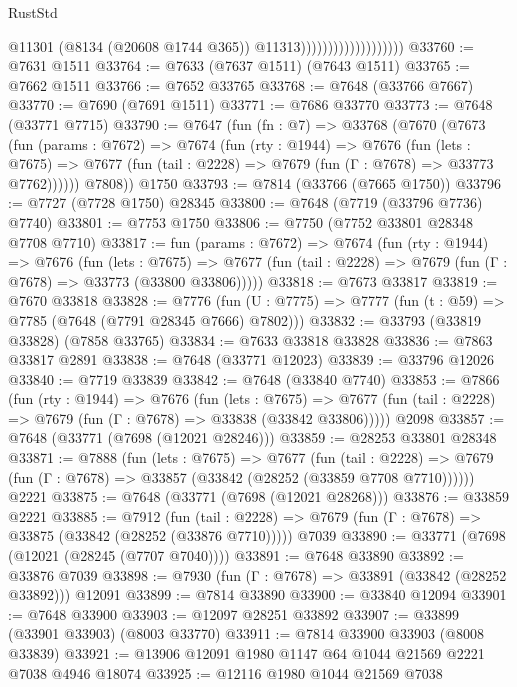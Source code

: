 \begin{lexlean}{RustStd}
\begin{coremodule}
                                          @11301
                                          (@8134 (@20608 @1744 @365))
                                          @11313)))))))))))))))))))
@33760 := @7631 @1511
@33764 := @7633 (@7637 @1511) (@7643 @1511)
@33765 := @7662 @1511
@33766 := @7652 @33765
@33768 := @7648 (@33766 @7667)
@33770 := @7690 (@7691 @1511)
@33771 := @7686 @33770
@33773 := @7648 (@33771 @7715)
@33790 := @7647
    (fun (fn : @7) =>
    @33768
      (@7670
        (@7673
          (fun (params : @7672) =>
          @7674
            (fun (rty : @1944) =>
            @7676
              (fun (lets : @7675) =>
              @7677 (fun (tail : @2228) => @7679 (fun (Γ : @7678) => @33773 @7762))))))
        @7808))
    @1750
@33793 := @7814 (@33766 (@7665 @1750))
@33796 := @7727 (@7728 @1750) @28345
@33800 := @7648 (@7719 (@33796 @7736) @7740)
@33801 := @7753 @1750
@33806 := @7750 (@7752 @33801 @28348 @7708 @7710)
@33817 := fun (params : @7672) =>
  @7674
    (fun (rty : @1944) =>
    @7676
      (fun (lets : @7675) =>
      @7677 (fun (tail : @2228) => @7679 (fun (Γ : @7678) => @33773 (@33800 @33806)))))
@33818 := @7673 @33817
@33819 := @7670 @33818
@33828 := @7776
    (fun (U : @7775) => @7777 (fun (t : @59) => @7785 (@7648 (@7791 @28345 @7666) @7802)))
@33832 := @33793 (@33819 @33828) (@7858 @33765)
@33834 := @7633 @33818 @33828
@33836 := @7863 @33817 @2891
@33838 := @7648 (@33771 @12023)
@33839 := @33796 @12026
@33840 := @7719 @33839
@33842 := @7648 (@33840 @7740)
@33853 := @7866
    (fun (rty : @1944) =>
    @7676
      (fun (lets : @7675) =>
      @7677 (fun (tail : @2228) => @7679 (fun (Γ : @7678) => @33838 (@33842 @33806)))))
    @2098
@33857 := @7648 (@33771 (@7698 (@12021 @28246)))
@33859 := @28253 @33801 @28348
@33871 := @7888
    (fun (lets : @7675) =>
    @7677
      (fun (tail : @2228) =>
      @7679 (fun (Γ : @7678) => @33857 (@33842 (@28252 (@33859 @7708 @7710))))))
    @2221
@33875 := @7648 (@33771 (@7698 (@12021 @28268)))
@33876 := @33859 @2221
@33885 := @7912
    (fun (tail : @2228) => @7679 (fun (Γ : @7678) => @33875 (@33842 (@28252 (@33876 @7710)))))
    @7039
@33890 := @33771 (@7698 (@12021 (@28245 (@7707 @7040))))
@33891 := @7648 @33890
@33892 := @33876 @7039
@33898 := @7930 (fun (Γ : @7678) => @33891 (@33842 (@28252 @33892))) @12091
@33899 := @7814 @33890
@33900 := @33840 @12094
@33901 := @7648 @33900
@33903 := @12097 @28251 @33892
@33907 := @33899 (@33901 @33903) (@8003 @33770)
@33911 := @7814 @33900 @33903 (@8008 @33839)
@33921 := @13906 @12091 @1980 @1147 @64 @1044 @21569 @2221 @7038 @4946 @18074
@33925 := @12116 @1980 @1044 @21569 @7038

\end{coremodule}
\end{lexlean}
